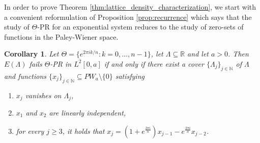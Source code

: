 \documentclass[reqno,a4paper,11pt]{amsart}
\numberwithin{equation}{section}
\newtheorem{corollary}[definition]{Corollary}
\def\N{{\mathbb N}}
\def\R{{\mathbb R}}
\newcommand\1{\mathds{1}}
\begin{document}
In order to prove Theorem \ref{thm:lattice_density_characterization}, we start with a convenient reformulation of Proposition \ref{prop:recurrence} which says that the study of $\Theta$-PR for an exponential system reduces to the study of zero-sets of functions in the Paley-Wiener space.

\begin{corollary}\label{cor:PW_recurrence}
Let $\Theta = \{ e^{2\pi i k/n} : k=0,\dots,n-1 \}$, let $\Lambda \subseteq \R$ and let $a>0$. Then $E(\Lambda)$ fails $\Theta$-PR in $L^2[0,a]$ if and only if there exist a cover $\{\Lambda_j\}_{j \in \N}$ of $\Lambda$ and functions $\{ x_j \}_{j \in \N} \subseteq PW_a \setminus \{ 0 \}$ satisfying
\begin{enumerate}
        \item $x_j$ vanishes on $\Lambda_j$,
        \item $x_1$ and $x_2$ are linearly independent,
        \item for every $j \geq 3$, it holds that $x_j = (1+e^{\frac{2\pi i }{n}})x_{j-1} - e^{\frac{2\pi i }{n}} x_{j-2}$.
    \end{enumerate}
\end{corollary}
\end{document}
